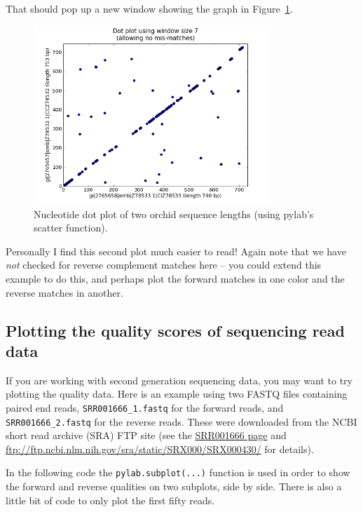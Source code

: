 \documentclass{report}
\begin{document}
\begin{latexonly}
\noindent That should pop up a new window showing the graph in Figure~\ref{fig:nuc-dot-plot-scatter}.
\begin{figure}[htbp]
\centering
\includegraphics[width=0.8\textwidth]{images/dot_plot_scatter.png}
\caption{Nucleotide dot plot of two orchid sequence lengths (using pylab's scatter function).}
\label{fig:nuc-dot-plot-scatter}
\end{figure}\end{latexonly}
Personally I find this second plot much easier to read!
Again note that we have \emph{not} checked for reverse complement matches here
-- you could extend this example to do this, and perhaps plot the forward
matches in one color and the reverse matches in another.

\subsection{Plotting the quality scores of sequencing read data}

If you are working with second generation sequencing data, you may want to try plotting
the quality data. Here is an example using two FASTQ files containing paired end reads,
\texttt{SRR001666\_1.fastq} for the forward reads, and  \texttt{SRR001666\_2.fastq} for
the reverse reads. These were downloaded from the NCBI short read archive (SRA) FTP site
(see the \href{http://www.ncbi.nlm.nih.gov/Traces/sra/sra.cgi?cmd=viewer&m=data&s=viewer&run=SRR001666}
{SRR001666 page} and \url{ftp://ftp.ncbi.nlm.nih.gov/sra/static/SRX000/SRX000430/}
for details).

In the following code the \verb|pylab.subplot(...)| function is used in order to show
the forward and reverse qualities on two subplots, side by side. There is also a little
bit of code to only plot the first fifty reads.
\end{document}
